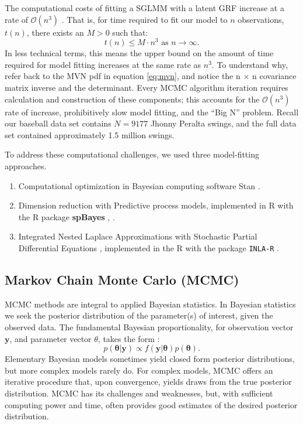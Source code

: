The computational costs of fitting a SGLMM with a latent GRF increase at a rate of $\mathcal{O}(n^{3})$ \citep{Finley2009}. That is, for time  required to fit our model to $n$ observations, $t(n)$, there exists an $M > 0$ such that:
$$t(n) \leq M \cdot n^{3} \text{ as } n \rightarrow \infty.$$
In less technical terms, this means the upper bound on the amount of time required for model fitting increases at the same rate as $n^{3}$. To understand why, refer back to the MVN pdf in equation \ref{eq:mvn}, and notice the n $\times$ n covariance matrix inverse and the determinant. Every MCMC algorithm iteration requires calculation and construction of these components; this accounts for the $\mathcal{O}(n^{3})$ rate of increase, prohibitively slow model fitting, and the ``Big N'' problem. Recall our baseball data set contains $N = 9177$ Jhonny Peralta swings, and the full data set contained approximately 1.5 million swings.

To address these computational challenges, we used three model-fitting approaches.
\begin{enumerate}
\item Computational optimization in Bayesian computing software Stan \citep{rstan}.
\item Dimension reduction with Predictive process models, implemented in R with the R package {\bf spBayes} \citep{Eidsvik2012}, \citep{Finley2013}.
\item Integrated Nested Laplace Approximations \citep{Rue2009} with Stochastic Partial Differential Equations \citep{Lindgren2011}, implemented in the R with the package \verb|INLA-R| \citep{Lindgren2015}.
\end{enumerate}

\subsection{Markov Chain Monte Carlo (MCMC)}

MCMC methods are integral to applied Bayesian statistics. In Bayesian statistics we seek the posterior distribution of the parameter(s) of interest, given the observed data. The fundamental Bayesian proportionality, for observation vector $\pmb{y}$, and parameter vector $\theta$, takes the form \citep{Gelman2014}:
\begin{equation} \label{eq:bayes}
p(\pmb{\theta}|\pmb{y}) \propto f(\pmb{y}|\pmb{\theta})p(\pmb{\theta}).
\end{equation}
Elementary Bayesian models sometimes yield closed form posterior distributions, but more complex models rarely do. For complex models, MCMC offers an iterative procedure that, upon convergence, yields draws from the true posterior distribution. MCMC has its challenges and weaknesses, but, with sufficient computing power and time, often provides good estimates of the desired posterior distribution. 

